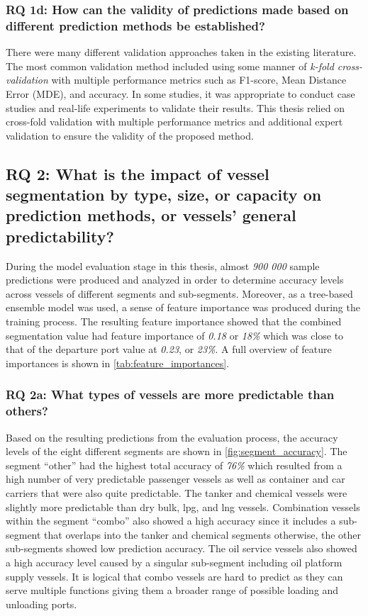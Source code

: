 \subsubsection{RQ 1d: How can the validity of predictions made based on different prediction methods be established?}

There were many different validation approaches taken in the existing literature. The most common validation method included using some manner of \textit{k-fold cross-validation} with multiple performance metrics such as F1-score, Mean Distance Error (MDE), and accuracy. In some studies, it was appropriate to conduct case studies and real-life experiments to validate their results. This thesis relied on cross-fold validation with multiple performance metrics and additional expert validation to ensure the validity of the proposed method.

\subsection{RQ 2: What is the impact of vessel segmentation by type, size, or capacity on prediction methods, or vessels' general predictability?}

During the model evaluation stage in this thesis, almost \textit{900 000} sample predictions were produced and analyzed in order to determine accuracy levels across vessels of different segments and sub-segments. Moreover, as a tree-based ensemble model was used, a sense of feature importance was produced during the training process. The resulting feature importance showed that the combined segmentation value had feature importance of \textit{0.18} or \textit{18\%} which was close to that of the departure port value at \textit{0.23}, or \textit{23\%}. A full overview of feature importances is shown in \cref{tab:feature_importances}.

\subsubsection{RQ 2a: What types of vessels are more predictable than others?}

Based on the resulting predictions from the evaluation process, the accuracy levels of the eight different segments are shown in \cref{fig:segment_accuracy}. The segment ``other'' had the highest total accuracy of \textit{76\%} which resulted from a high number of very predictable passenger vessels as well as container and car carriers that were also quite predictable. The tanker and chemical vessels were slightly more predictable than dry bulk, \acrfull{lpg}, and \acrfull{lng} vessels. Combination vessels within the segment ``combo'' also showed a high accuracy since it includes a sub-segment that overlaps into the tanker and chemical segments otherwise, the other sub-segments showed low prediction accuracy. The oil service vessels also showed a high accuracy level caused by a singular sub-segment including oil platform supply vessels. It is logical that combo vessels are hard to predict as they can serve multiple functions giving them a broader range of possible loading and unloading ports.

